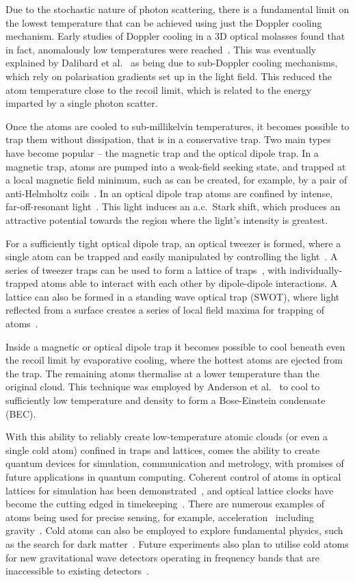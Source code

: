 Due to the stochastic nature of photon scattering, there is a fundamental limit
on the lowest temperature that can be achieved using just the Doppler cooling 
mechanism.  Early studies of Doppler cooling in a 3D optical molasses
found that in fact, anomalously low temperatures
were reached~\cite{Lett1988}. This was eventually explained by
Dalibard et al.~\cite{Dalibard:89} as being due to sub-Doppler cooling
mechanisms, which rely on polarisation gradients set up in the light field.
This reduced the atom temperature close to the recoil limit, which is
related to the energy imparted by a single photon scatter.

Once the atoms are cooled to sub-millikelvin temperatures, it becomes possible
to trap them without dissipation, that is in a conservative trap. Two main
types have become popular -- the magnetic trap and the optical dipole trap. In
a magnetic trap, atoms are pumped into a weak-field seeking state, and trapped
at a local magnetic field minimum, such as can be created, for example, by a
pair of anti-Helmholtz coils~\cite{PhysRevLett.54.2596}. In an optical dipole
trap atoms are confined by intense, far-off-resonant light~\cite{Chu1986}. This
light induces an a.c.\ Stark shift, which produces an attractive potential
towards the region where the light's intensity is greatest.

For a sufficiently tight optical dipole trap, an optical tweezer is formed,
where a single atom can be trapped and easily manipulated by controlling the
light~\cite{Schlosser2001}. A series of tweezer traps can be used to form a
lattice of traps~\cite{Schlosser2001}, with individually-trapped atoms able to
interact with each other by dipole-dipole interactions. A lattice can also be
formed in a standing wave optical trap (SWOT), where light reflected from a
surface creates a series of local field maxima for trapping of
atoms~\cite{Wu2017}.

Inside a magnetic or optical dipole trap it becomes possible to cool beneath
even the recoil limit by evaporative cooling, where the hottest atoms are
ejected from the trap. The remaining atoms thermalise at a lower temperature
than the original cloud. This technique was employed by Anderson et
al.~\cite{Anderson198} to cool \esRb{} to sufficiently low temperature and
density to form a Bose-Einstein condensate (BEC).

With this ability to reliably create low-temperature atomic clouds (or even a
single cold atom) confined in traps and lattices, comes the ability to create
quantum devices for simulation, communication and metrology, with promises of
future applications in quantum computing. Coherent control of atoms in optical
lattices for simulation has been demonstrated~\cite{Schafer2020}, and optical
lattice clocks have become the cutting edged in
timekeeping~\cite{PhysRevX.8.021036}. There are numerous examples of atoms
being used for precise sensing, for example, acceleration~\cite{Chen2019}
including gravity~\cite{Stray2022}. Cold atoms can also be employed to
explore fundamental physics, such as the search for dark
matter~\cite{Wcislo2018}. Future experiments also plan to utilise cold atoms
for new gravitational wave detectors operating in frequency bands that are
inaccessible to existing detectors~\cite{Badurina_2020}.

